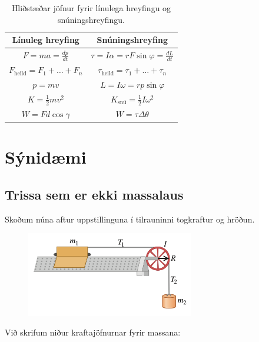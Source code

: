 \begin{table}[H]
\begin{center}
\begin{tabular}{|c|c|}
\hline
\textbf{Línuleg hreyfing} & \textbf{Snúningshreyfing} \\
\hline
$F = ma = \frac{dp}{dt} $ & $\tau = I\alpha = rF\sin\varphi = \frac{dL}{dt}$ \\
$F_{\text{heild}} = F_1 + \ldots + F_n $ & $\tau_{\text{heild}} = \tau_1 + \ldots + \tau_n$ \\
$p = mv $ & $L = I\omega = rp\sin\varphi$ \\
$K = \frac{1}{2}mv^2$ & $K_{\text{snú}} = \frac{1}{2}I\omega^2$ \\
$W = Fd\cos\gamma$ & $W = \tau \Delta \theta$ \\
\hline
\end{tabular}
\caption{Hliðstæðar jöfnur fyrir línulega hreyfingu og snúningshreyfingu.}
\label{tafla:laddi}
\end{center}
\end{table}



\section{Sýnidæmi}

\subsection*{Trissa sem er ekki massalaus}

Skoðum núna aftur uppstillinguna í tilrauninni togkraftur og hröðun.

\begin{figure}[H]
    \centering
    \includegraphics[width=0.65\textwidth]{images/togkrafturoghverfitregda.png}
\end{figure}

Við skrifum niður kraftajöfnurnar fyrir massana:

